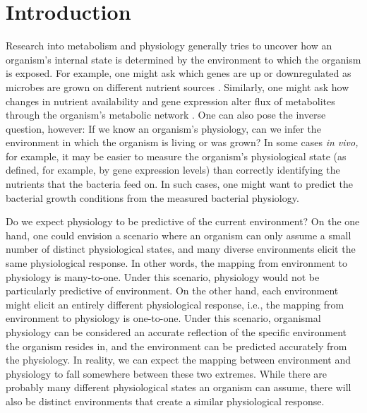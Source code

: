 \documentclass[12pt]{article}
\begin{document}

\section{Introduction}

Research into metabolism and physiology generally tries to uncover how an organism's internal state is determined by the environment to which the organism is exposed. For example, one might ask which genes are up or downregulated as microbes are grown on different nutrient sources \cite{Taoetal1999,Huaetal2004,Wuetal2004}. Similarly, one might ask how changes in nutrient availability and gene expression alter flux of metabolites through the organism's metabolic network \cite{FischerSauer2003,Leeetal2009,Boeretal2010,HaverkornvanRijsewijketal2011}. One can also pose the inverse question, however: If we know an organism's physiology, can we infer the environment in which the organism is living or was grown? In some cases \emph{in vivo,} for example, it may be easier to measure the organism's physiological state (as defined, for example, by gene expression levels) than correctly identifying the nutrients that the bacteria feed on. In such cases, one might want to predict the bacterial growth conditions from the measured bacterial physiology. 

Do we expect physiology to be predictive of the current environment? On the one hand, one could envision a scenario where an organism can only assume a small number of distinct physiological states, and many diverse environments elicit the same physiological response. In other words, the mapping from environment to physiology is many-to-one. Under this scenario, physiology would not be particularly predictive of environment. On the other hand, each environment might elicit an entirely different physiological response, i.e., the mapping from environment to physiology is one-to-one. Under this scenario, organismal physiology can be considered an accurate reflection of the specific environment the organism resides in, and the environment can be predicted accurately from the physiology. In reality, we can expect the mapping between environment and physiology to fall somewhere between these two extremes. While there are probably many different physiological states an organism can assume, there will also be distinct environments that create a similar physiological response.
\end{document}
